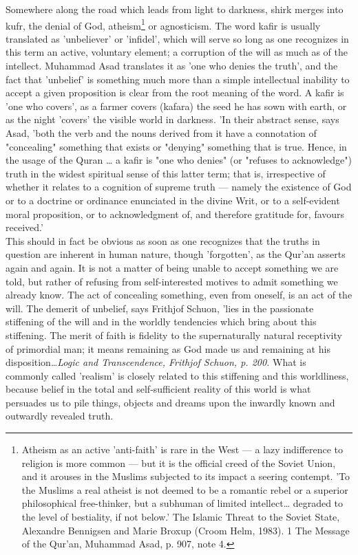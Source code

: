\documentclass[11pt, b5paper, twoside]{book}
\begin{document}
Somewhere along the road which leads from light to darkness, shirk merges into kufr, the denial of 
God, atheism\footnote{Atheism as an active 'anti-faith' is rare in the West --- a lazy indifference to religion is more common --- but it is the official creed of the Soviet Union, and it arouses in the Muslims subjected to its impact a seering contempt. 'To the Muslims a real atheist is not deemed to be a romantic rebel or 
a superior philosophical free-thinker, but a subhuman of limited intellect\ldots{} degraded to the level 
of bestiality, if not below.' The Islamic Threat to the Soviet State, Alexandre Bennigsen and Marie 
Broxup (Croom Helm, 1983). 1 The Message of the Qur'an, Muhammad Asad, p. 907, note 4.} or agnosticism. The word kafir is usually translated as 'unbeliever' or 'infidel', which will serve so long as one recognizes in this term an active, voluntary element; a corruption of the will as much as of the intellect. Muhammad Asad translates it as 'one who denies the truth', and the fact that 'unbelief' is something much more than a simple intellectual inability to accept a given proposition is clear from the root meaning of the word. A kafir is 'one who covers', as a farmer covers (kafara) the seed he has sown with earth, or as the night 'covers' the visible world in darkness. 'In their abstract sense, says Asad, 'both the verb and the nouns derived from it have a connotation of "concealing" something that exists or "denying" something that is true. Hence, in the usage of the Quran \ldots{} a kafir is "one who denies" (or "refuses to acknowledge") truth in the widest spiritual sense of this latter term; that is, irrespective of whether it relates to a cognition of supreme truth --- namely the existence of God or to a doctrine or ordinance enunciated in the divine Writ, or to a self-evident moral proposition, or to acknowledgment of, and therefore gratitude for, favours received.'\\

This should in fact be obvious as soon as one recognizes that the truths in question are inherent in 
human nature, though 'forgotten', as the Qur'an asserts again and again. It is not a matter of being 
unable to accept something we are told, but rather of refusing from self-interested motives to admit 
something we already know. The act of concealing something, even from oneself, is an act of the will. 
The demerit of unbelief, says Frithjof Schuon, 'lies in the passionate stiffening of the will and in 
the worldly tendencies which bring about this stiffening. The merit of faith is fidelity to the 
supernaturally natural receptivity of primordial man; it means remaining as God made us and remaining 
at his disposition\ldots{}\emph{Logic and Transcendence, Frithjof Schuon, p. 200.} What is commonly called 'realism' is closely related to this stiffening and this worldliness, because belief in the total and self-sufficient reality of this world is what persuades us to pile things, objects and dreams upon the inwardly known and outwardly revealed truth. \\
\end{document}
